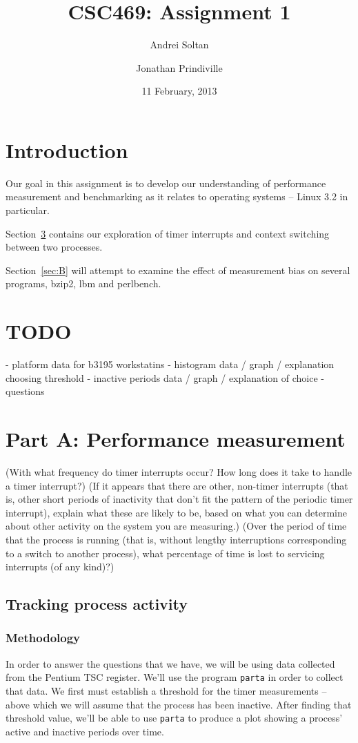 \documentclass{article}
\author{Andrei Soltan \and Jonathan Prindiville}
\title{CSC469: Assignment 1}
\date{11 February, 2013}
\begin{document}
\maketitle

\tableofcontents

\newpage
\section{Introduction}
Our goal in this assignment is to develop our understanding of performance
measurement and benchmarking as it relates to operating systems -- Linux 3.2
in particular.

Section~\ref{sec:A} contains our exploration of timer interrupts and context
switching between two processes.

Section~\ref{sec:B} will attempt to examine the effect of measurement bias
on several programs, bzip2, lbm and perlbench.

\section{TODO}
- platform data for b3195 workstatins
- histogram data / graph / explanation choosing threshold
- inactive periods data / graph / explanation of choice
- questions

\newpage
\section{Part A: Performance measurement}
\label{sec:A}

(With what frequency do timer interrupts occur? How long does it take to handle a timer interrupt?)
(If it appears that there are other, non-timer interrupts (that is, other short periods of inactivity that don't fit the pattern of the periodic timer interrupt), explain what these are likely to be, based on what you can determine about other activity on the system you are measuring.)
(Over the period of time that the process is running (that is, without lengthy interruptions corresponding to a switch to another process), what percentage of time is lost to servicing interrupts (of any kind)?)

\subsection{Tracking process activity}

\subsubsection{Methodology}
In order to answer the questions that we have, we will be using data collected
from the Pentium TSC register. We'll use the program \lstinline{parta} in order
to collect that data. We first must establish a threshold for the timer
measurements -- above which we will assume that the process has been inactive.
After finding that threshold value, we'll be able to use \lstinline{parta} to
produce a plot showing a process' active and inactive periods over time.
\end{document}
